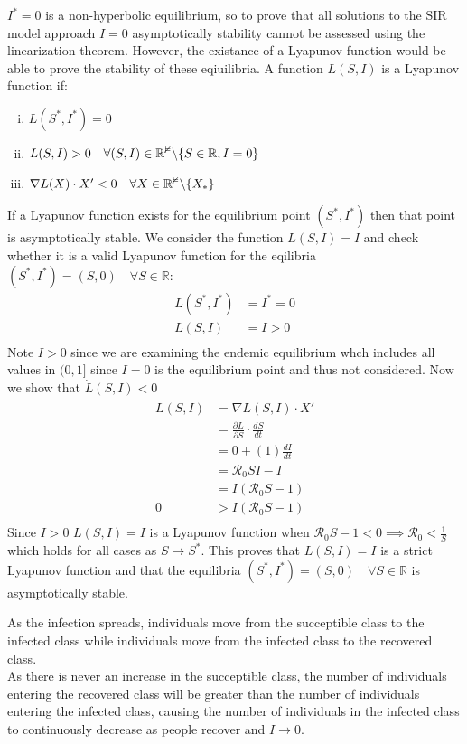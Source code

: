 $I^*=0$ is a non-hyperbolic equilibrium, so to prove that all solutions to the SIR model approach $I=0$ asymptotically stability cannot be assessed using the linearization theorem.
However, the existance of a Lyapunov function would be able to prove the stability of these eqiuilibria.
A function $L(S,I)$ is a Lyapunov function if:
\begin{enumerate}[(i)]
    \item $L(S^*,I^*) = 0$
    \item $L(S,I) > 0 \quad \forall (S,I) \in \mathbb{R^2} \char`\\ \{S \in \mathbb{R},I=0 \}$
    \item $\nabla L(X) \cdot X' < 0 \quad \forall X \in \mathbb{R^2}\char`\\ \{X_*\}$
\end{enumerate}
If a Lyapunov function exists for the equilibrium point $(S^*,I^*)$ then that point is asymptotically stable.
We consider the function $L(S,I) = I$ and check whether it is a valid Lyapunov function for the eqilibria $(S^*,I^*) = (S,0)\quad \forall S \in \mathbb{R}$:
\begin{align*}
    L(S^*,I^*) &= I^* = 0\\
    L(S,I)     &= I > 0\\
\end{align*}
Note $I >0$ since we are examining the endemic equilibrium whch includes all values in $(0,1]$ since $I=0$ is the equilibrium point and thus not considered.
Now we show that $\dot{L}(S,I) < 0$
\begin{align*}
    \dot{L}(S,I) &= \nabla L(S,I) \cdot X'\\
                 &= \frac{\partial L}{\partial S}\cdot \frac{dS}{dt}\\
                 & = 0 + (1)\frac{dI}{dt}\\
                 &={\mathcal R_0}SI -I\\
                 &=I({\mathcal R_0}S-1)\\
    0            &> I({\mathcal R_0}S-1) \label{eq:1}\\
\end{align*}
Since $I > 0$ $L(S,I) = I$ is a Lyapunov function when ${\mathcal R_0}S -1 < 0 \implies {\mathcal R_0} < \frac{1}{S}$ which holds for all cases as $S \to S^*$.
This proves that $L(S,I) = I$ is a strict Lyapunov function and that the equilibria $(S^*,I^*) = (S,0)\quad \forall S \in \mathbb{R}$ is asymptotically stable.\par
As the infection spreads, individuals move from the succeptible class to the infected class while individuals move from the infected class to the recovered class.\\
As there is never an increase in the succeptible class, the number of individuals entering the recovered class will be greater than the number of individuals entering the infected class, causing the number of individuals in the infected class to continuously decrease as people recover and $I \to 0$.
